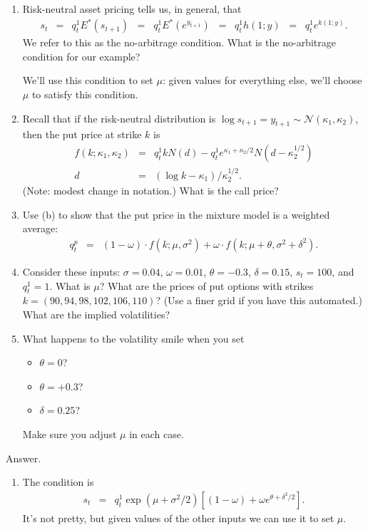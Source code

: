 \documentclass[11pt]{article}
\begin{document}
\begin{enumerate}
\begin{enumerate}
\item Risk-neutral asset pricing tells us, in general, that
\begin{eqnarray*}
    s_t &=& q^1_t E^* (s_{t+1} )
            \;\;=\;\; q^1_t E^* \left( e^{y_{t+1}}\right)
            \;\;=\;\; q^1_t  h(1; y)
            \;\;=\;\; q^1_t  e^{k(1; y)}  .
\end{eqnarray*}
We refer to this as the no-arbitrage condition.
What is the no-arbitrage condition for our example?

We'll use this condition to set $\mu$:
given values for everything else, we'll choose $\mu$ to satisfy this condition.

\item Recall that if the risk-neutral distribution is
 $\log s_{t+1} = y_{t+1} \sim \mathcal{N}(\kappa_1,\kappa_2)$,
 then the put price at strike $k$ is
\begin{eqnarray*}
    f(k; \kappa_1, \kappa_2) &=& q^1_t k N(d) - q^1_t e^{\kappa_1 + \kappa_2/2}
            N(d-\kappa_2^{1/2}) \\
            d&=& (\log k - \kappa_1)/\kappa_2^{1/2} .
\end{eqnarray*}
(Note:  modest change in notation.)
What is the call price?

\item
Use (b) to show that the put price in the mixture model is a weighted average:
\begin{eqnarray*}
    q^p_t &=& (1-\omega) \cdot f(k; \mu, \sigma^2) +
        \omega \cdot f(k; \mu+\theta, \sigma^2 + \delta^2) .
\end{eqnarray*}

\item Consider these inputs:
$\sigma = 0.04$, $\omega = 0.01$,
$\theta = -0.3$, $\delta = 0.15$,
$s_t = 100$, and $q^1_t = 1$.
What is $\mu$?
What are the prices of put options with strikes
$ k = (90, 94, 98, 102, 106, 110)$?
(Use a finer grid if you have this automated.)
What are the implied volatilities?

\item What happens to the volatility smile when you set
\begin{itemize}
\item $\theta = 0$?
\item $\theta = + 0.3$?
\item $\delta = 0.25$?
\end{itemize}
Make sure you adjust $\mu$ in each case.
\end{enumerate}
%
Answer.
\begin{enumerate}
\item The condition is
\begin{eqnarray*}
    s_t &=& q^1_t \exp( \mu + \sigma^2 / 2 )
            \left[ (1-\omega) + \omega e^{ \theta + \delta^2 / 2 } \right] .
\end{eqnarray*}
It's not pretty, but given values of the other inputs we can use it to set $\mu$.


\end{enumerate}
\end{enumerate}
\end{document}
